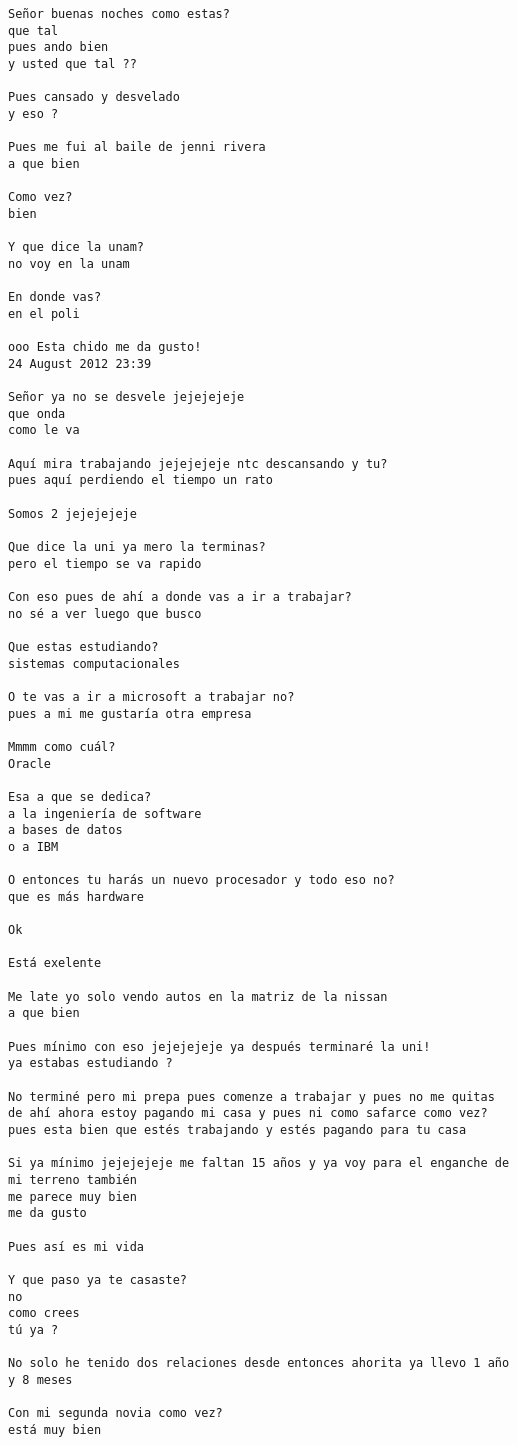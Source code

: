 \begin{verbatim}
Señor buenas noches como estas?
que tal
pues ando bien
y usted que tal ??

Pues cansado y desvelado
y eso ?

Pues me fui al baile de jenni rivera
a que bien

Como vez?
bien

Y que dice la unam?
no voy en la unam

En donde vas?
en el poli

ooo Esta chido me da gusto!
24 August 2012 23:39

Señor ya no se desvele jejejejeje
que onda
como le va

Aquí mira trabajando jejejejeje ntc descansando y tu?
pues aquí perdiendo el tiempo un rato

Somos 2 jejejejeje

Que dice la uni ya mero la terminas?
pero el tiempo se va rapido

Con eso pues de ahí a donde vas a ir a trabajar?
no sé a ver luego que busco

Que estas estudiando?
sistemas computacionales

O te vas a ir a microsoft a trabajar no?
pues a mi me gustaría otra empresa

Mmmm como cuál?
Oracle

Esa a que se dedica?
a la ingeniería de software
a bases de datos
o a IBM

O entonces tu harás un nuevo procesador y todo eso no?
que es más hardware

Ok

Está exelente

Me late yo solo vendo autos en la matriz de la nissan
a que bien

Pues mínimo con eso jejejejeje ya después terminaré la uni!
ya estabas estudiando ?

No terminé pero mi prepa pues comenze a trabajar y pues no me quitas de ahí ahora estoy pagando mi casa y pues ni como safarce como vez?
pues esta bien que estés trabajando y estés pagando para tu casa

Si ya mínimo jejejejeje me faltan 15 años y ya voy para el enganche de mi terreno también
me parece muy bien
me da gusto

Pues así es mi vida

Y que paso ya te casaste?
no
como crees
tú ya ?

No solo he tenido dos relaciones desde entonces ahorita ya llevo 1 año y 8 meses

Con mi segunda novia como vez?
está muy bien


\end{verbatim}
